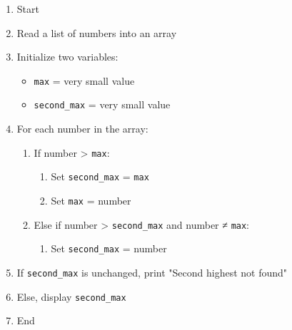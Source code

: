 \begin{enumerate}
    \item Start
    \item Read a list of numbers into an array
    \item Initialize two variables:
    \begin{itemize}
        \item \texttt{max} = very small value
        \item \texttt{second\_max} = very small value
    \end{itemize}
    \item For each number in the array:
    \begin{enumerate}
        \item If number > \texttt{max}:
        \begin{enumerate}
            \item Set \texttt{second\_max} = \texttt{max}
            \item Set \texttt{max} = number
        \end{enumerate}
        \item Else if number > \texttt{second\_max} and number ≠ \texttt{max}:
        \begin{enumerate}
            \item Set \texttt{second\_max} = number
        \end{enumerate}
    \end{enumerate}
    \item If \texttt{second\_max} is unchanged, print "Second highest not found"
    \item Else, display \texttt{second\_max}
    \item End
\end{enumerate}
